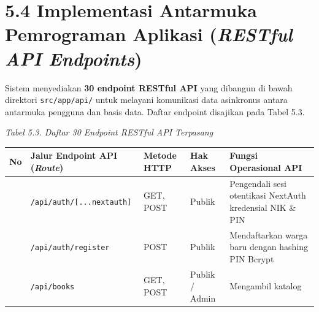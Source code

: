 \documentclass[
  indonesian,
  12pt,
]{report}
\newcounter{none} %
\begin{document}
\section{\texorpdfstring{5.4 Implementasi Antarmuka Pemrograman Aplikasi
(\emph{RESTful API
Endpoints})}{5.4 Implementasi Antarmuka Pemrograman Aplikasi (RESTful API Endpoints)}}\label{implementasi-antarmuka-pemrograman-aplikasi-restful-api-endpoints}

Sistem menyediakan \textbf{30 endpoint RESTful API} yang dibangun di
bawah direktori \texttt{src/app/api/} untuk melayani komunikasi data
asinkronus antara antarmuka pengguna dan basis data. Daftar endpoint
disajikan pada Tabel 5.3.

\emph{Tabel 5.3. Daftar 30 Endpoint RESTful API Terpasang}

{\def\LTcaptype{none} %
\begin{longtable}[]{@{}
  >{\centering\arraybackslash}p{}
  >{\raggedright\arraybackslash}p{}
  >{\centering\arraybackslash}p{}
  >{\centering\arraybackslash}p{}
  >{\raggedright\arraybackslash}p{}@{}}
\toprule\noalign{}
\begin{minipage}[b]{\linewidth}\centering
No
\end{minipage} & \begin{minipage}[b]{\linewidth}\raggedright
Jalur Endpoint API (\emph{Route})
\end{minipage} & \begin{minipage}[b]{\linewidth}\centering
Metode HTTP
\end{minipage} & \begin{minipage}[b]{\linewidth}\centering
Hak Akses
\end{minipage} & \begin{minipage}[b]{\linewidth}\raggedright
Fungsi Operasional API
\end{minipage} \\
\midrule\noalign{}
\endhead
\bottomrule\noalign{}
\endlastfoot
1 & \texttt{/api/auth/{[}...nextauth{]}} & GET, POST & Publik &
Pengendali sesi otentikasi NextAuth kredensial NIK \& PIN \\
2 & \texttt{/api/auth/register} & POST & Publik & Mendaftarkan warga
baru dengan hashing PIN Bcrypt \\
3 & \texttt{/api/books} & GET, POST & Publik / Admin & Mengambil katalog

\end{longtable}}
\end{document}
